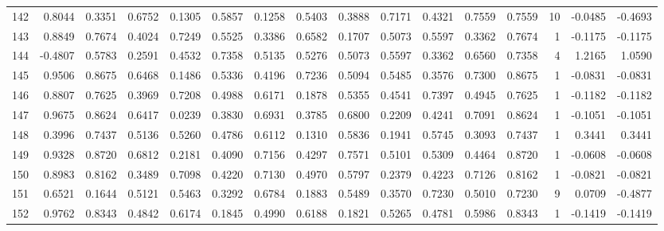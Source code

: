 \begin{tabular}{lrrrrrrrrrrrrrrr}
142 &      0.8044 &  0.3351 &  0.6752 &  0.1305 &  0.5857 &  0.1258 &  0.5403 &  0.3888 &  0.7171 &  0.4321 &   0.7559 &     0.7559 &     10 &                   -0.0485 &                    -0.4693 \\
143 &      0.8849 &  0.7674 &  0.4024 &  0.7249 &  0.5525 &  0.3386 &  0.6582 &  0.1707 &  0.5073 &  0.5597 &   0.3362 &     0.7674 &      1 &                   -0.1175 &                    -0.1175 \\
144 &     -0.4807 &  0.5783 &  0.2591 &  0.4532 &  0.7358 &  0.5135 &  0.5276 &  0.5073 &  0.5597 &  0.3362 &   0.6560 &     0.7358 &      4 &                    1.2165 &                     1.0590 \\
145 &      0.9506 &  0.8675 &  0.6468 &  0.1486 &  0.5336 &  0.4196 &  0.7236 &  0.5094 &  0.5485 &  0.3576 &   0.7300 &     0.8675 &      1 &                   -0.0831 &                    -0.0831 \\
146 &      0.8807 &  0.7625 &  0.3969 &  0.7208 &  0.4988 &  0.6171 &  0.1878 &  0.5355 &  0.4541 &  0.7397 &   0.4945 &     0.7625 &      1 &                   -0.1182 &                    -0.1182 \\
147 &      0.9675 &  0.8624 &  0.6417 &  0.0239 &  0.3830 &  0.6931 &  0.3785 &  0.6800 &  0.2209 &  0.4241 &   0.7091 &     0.8624 &      1 &                   -0.1051 &                    -0.1051 \\
148 &      0.3996 &  0.7437 &  0.5136 &  0.5260 &  0.4786 &  0.6112 &  0.1310 &  0.5836 &  0.1941 &  0.5745 &   0.3093 &     0.7437 &      1 &                    0.3441 &                     0.3441 \\
149 &      0.9328 &  0.8720 &  0.6812 &  0.2181 &  0.4090 &  0.7156 &  0.4297 &  0.7571 &  0.5101 &  0.5309 &   0.4464 &     0.8720 &      1 &                   -0.0608 &                    -0.0608 \\
150 &      0.8983 &  0.8162 &  0.3489 &  0.7098 &  0.4220 &  0.7130 &  0.4970 &  0.5797 &  0.2379 &  0.4223 &   0.7126 &     0.8162 &      1 &                   -0.0821 &                    -0.0821 \\
151 &      0.6521 &  0.1644 &  0.5121 &  0.5463 &  0.3292 &  0.6784 &  0.1883 &  0.5489 &  0.3570 &  0.7230 &   0.5010 &     0.7230 &      9 &                    0.0709 &                    -0.4877 \\
152 &      0.9762 &  0.8343 &  0.4842 &  0.6174 &  0.1845 &  0.4990 &  0.6188 &  0.1821 &  0.5265 &  0.4781 &   0.5986 &     0.8343 &      1 &                   -0.1419 &                    -0.1419 \\

\end{tabular}
